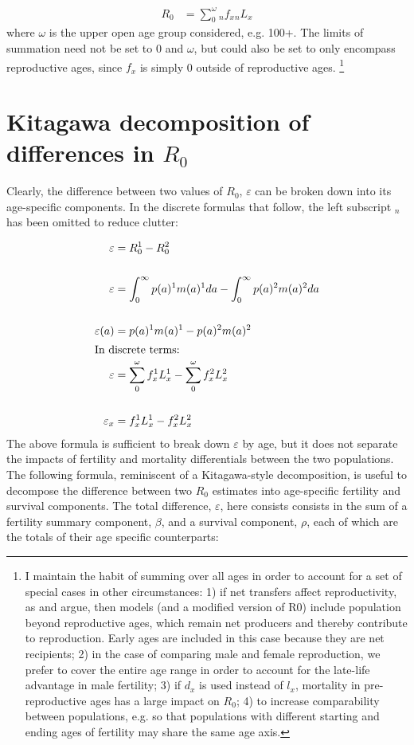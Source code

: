\documentclass{article}
\begin{document}
\begin{align}
R_{0} &= \sum_{0}^{\omega} {}_{n}f_{x} {}_{n}L_{x} \label{eq1}
\end{align}
where $\omega$ is the upper open age group considered, e.g. 100+. The limits of summation need not be set to $0$ and $\omega$, but could also be set to only encompass reproductive ages, since $f_{x}$ is simply 0 outside of reproductive ages. \footnote{I maintain the habit of summing over all ages in order to account for a set of special cases in other circumstances: 1) if net transfers affect reproductivity, as \citet{lee2003rethinking} and \citet{kaplan2003embodied} argue, then models (and a modified version of R0) include population beyond reproductive ages, which remain net producers and thereby contribute to reproduction. Early ages are included in this case because they are net recipients; 2) in the case of comparing male and female reproduction, we prefer to cover the entire age range in order to account for the late-life advantage in male fertility; 3) if $d_{x}$ is used instead of $l_{x}$, mortality in pre-reproductive ages has a large impact on $R_{0}$; 4) to increase comparability between populations, e.g. so that populations with different starting and ending ages of fertility may share the same age axis.}

\section*{Kitagawa decomposition of differences in $R_{0}$}
Clearly, the difference between two values of $R_{0}$, $\varepsilon$ can be broken down into its age-specific components. In the discrete formulas that follow, the left subscript ${}_n$ has been omitted to reduce clutter:

\begin{align}
	\varepsilon   				&= R_{0}^{1} - R_{0}^{2}\notag \\ \notag \\
	\varepsilon   				&= \int_{0}^{\infty}p(a)^{1}m(a)^{1}da - \int_{0}^{\infty}p(a)^{2}m(a)^{2}da \notag \\ \notag \\
	\varepsilon(a) 				&= p(a)^{1}m(a)^{1} - p(a)^{2}m(a)^{2} \notag \\
	\intertext{In discrete terms:}
	\varepsilon   				&= \sum_{0}^{\omega} f _{x}^{1} L _{x}^{1} - \sum_{0}^{\omega} f _{x}^{2} L _{x}^{2} \notag \\ \notag \\
	\varepsilon _{x} 			&= f_{x}^{1}  L _{x}^{1} - f _{x}^{2} L _{x}^{2}\label{eq2}
\end{align}
The above formula is sufficient to break down $\varepsilon$ by age, but it does not separate the impacts of fertility and mortality differentials between the two populations. The following formula, reminiscent of a Kitagawa-style decomposition\citep{kltagawa1955components}, is useful to decompose the difference between two $R_{0}$ estimates into age-specific fertility and survival components. The total difference, $\varepsilon$, here consists consists in the sum of a fertility summary component, $\beta$, and a survival component, $\rho$, each of which are the totals of their age specific counterparts:
\end{document}
